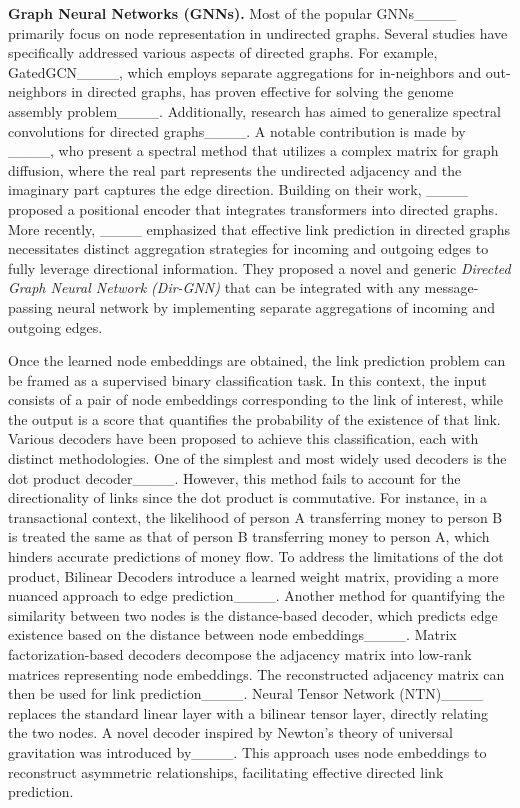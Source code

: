 \textbf{Graph Neural Networks (GNNs).} Most of the popular GNNs____ primarily focus on node representation in undirected graphs. Several studies have specifically addressed various aspects of directed graphs. For example, GatedGCN____, which employs separate aggregations for in-neighbors and out-neighbors in directed graphs, has proven effective for solving the genome assembly problem____. Additionally, research has aimed to generalize spectral convolutions for directed graphs____. A notable contribution is made by ____, who present a spectral method that utilizes a complex matrix for graph diffusion, where the real part represents the undirected adjacency and the imaginary part captures the edge direction. Building on their work, ____ proposed a positional encoder that integrates transformers into directed graphs. More recently, ____ emphasized that effective link prediction in directed graphs necessitates distinct aggregation strategies for incoming and outgoing edges to fully leverage directional information. They proposed a novel and generic \emph{Directed Graph Neural Network (Dir-GNN)} that can be integrated with any message-passing neural network by implementing separate aggregations of incoming and outgoing edges. 

Once the learned node embeddings are obtained, the link prediction problem can be framed as a supervised binary classification task. In this context, the input consists of a pair of node embeddings corresponding to the link of interest, while the output is a score that quantifies the probability of the existence of that link. Various decoders have been proposed to achieve this classification, each with distinct methodologies. One of the simplest and most widely used decoders is the dot product decoder____. However, this method fails to account for the directionality of links since the dot product is commutative. For instance, in a transactional context, the likelihood of person A transferring money to person B is treated the same as that of person B transferring money to person A, which hinders accurate predictions of money flow. To address the limitations of the dot product, Bilinear Decoders introduce a learned weight matrix, providing a more nuanced approach to edge prediction____. Another method for quantifying the similarity between two nodes is the distance-based decoder, which predicts edge existence based on the distance between node embeddings____. Matrix factorization-based decoders decompose the adjacency matrix into low-rank matrices representing node embeddings. The reconstructed adjacency matrix can then be used for link prediction____. Neural Tensor Network (NTN)____ replaces the standard linear layer with a bilinear tensor layer, directly relating the two nodes.  A novel decoder inspired by Newton's theory of universal gravitation was introduced by____. This approach uses node embeddings to reconstruct asymmetric relationships, facilitating effective directed link prediction.
